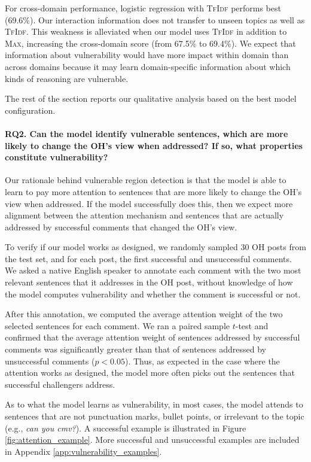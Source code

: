 \documentclass[11pt,a4paper]{article}
\newcommand{\tfidf}{\textsc{TfIdf}}
\newcommand{\mmax}{\textsc{Max}}
\begin{document}
For cross-domain performance, logistic regression with \tfidf{} performs best (69.6\%). Our interaction information does not transfer to unseen topics as well as \tfidf{}. This weakness is alleviated when our model uses \tfidf{} in addition to \mmax{}, increasing the cross-domain score (from 67.5\% to 69.4\%).
We expect that information about vulnerability would have more impact within domain than across domains because it may learn domain-specific information about which kinds of reasoning are vulnerable.

The rest of the section reports our qualitative analysis based on the best model configuration.



\paragraph{RQ2. Can the model identify vulnerable sentences, which are more likely to change the OH's view when addressed? If so, what properties constitute vulnerability?} 
Our rationale behind vulnerable region detection is that the model is able to learn to pay more attention to sentences that are more likely to change the OH's view when addressed. If the model successfully does this, then we expect more alignment between the attention mechanism and sentences that are actually addressed by successful comments that changed the OH's view.

To verify if our model works as designed, we randomly sampled 30 OH posts from the test set, and for each post, the first successful and unsuccessful comments. We asked a native English speaker to annotate each comment with the two most relevant sentences that it addresses in the OH post, without knowledge of how the model computes vulnerability and whether the comment is successful or not.

After this annotation, we computed the average attention weight of the two selected sentences for each comment. We ran a paired sample $t$-test and confirmed that the average attention weight of sentences addressed by successful comments was significantly greater than that of sentences addressed by unsuccessful comments ($p < 0.05$). Thus, as expected in the case where the attention works as designed, the model more often picks out the sentences that successful challengers address.

As to what the model learns as vulnerability, in most cases, the model attends to sentences that are not punctuation marks, bullet points, or irrelevant to the topic (e.g., \emph{can you cmv?}). A successful example is illustrated in Figure \ref{fig:attention_example}.  More successful and unsuccessful examples are included in Appendix \ref{app:vulnerability_examples}.
\end{document}
